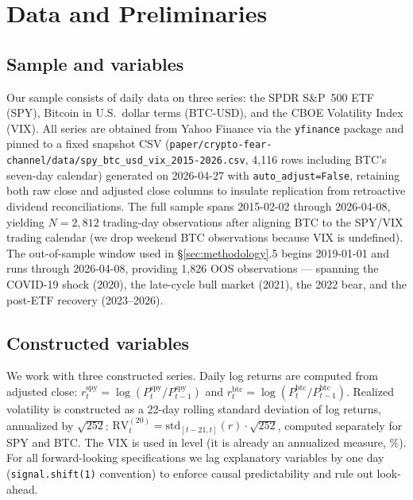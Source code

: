 \documentclass[11pt,a4paper]{article}
\begin{document}
\section{Data and Preliminaries}
\label{sec:data}

\subsection{Sample and variables}

Our sample consists of daily data on three series: the SPDR S\&P~500 ETF (SPY), Bitcoin in U.S.\ dollar terms (BTC-USD), and the CBOE Volatility Index (VIX). All series are obtained from Yahoo Finance via the \texttt{yfinance} package and pinned to a fixed snapshot CSV (\texttt{paper/crypto-fear-channel/data/spy\_btc\_usd\_vix\_2015-2026.csv}, 4{,}116 rows including BTC's seven-day calendar) generated on 2026-04-27 with \texttt{auto\_adjust=False}, retaining both raw close and adjusted close columns to insulate replication from retroactive dividend reconciliations. The full sample spans 2015-02-02 through 2026-04-08, yielding $N = 2{,}812$ trading-day observations after aligning BTC to the SPY/VIX trading calendar (we drop weekend BTC observations because VIX is undefined). The out-of-sample window used in \S\ref{sec:methodology}.5 begins 2019-01-01 and runs through 2026-04-08, providing 1{,}826 OOS observations --- spanning the COVID-19 shock (2020), the late-cycle bull market (2021), the 2022 bear, and the post-ETF recovery (2023--2026).%

\subsection{Constructed variables}

We work with three constructed series. Daily log returns are computed from adjusted close: $r^{\text{spy}}_t = \log(P^{\text{spy}}_t / P^{\text{spy}}_{t-1})$ and $r^{\text{btc}}_t = \log(P^{\text{btc}}_t / P^{\text{btc}}_{t-1})$. Realized volatility is constructed as a 22-day rolling standard deviation of log returns, annualized by $\sqrt{252}$: $\text{RV}^{(20)}_t = \text{std}_{[t-21,t]}(r) \cdot \sqrt{252}$, computed separately for SPY and BTC. The VIX is used in level (it is already an annualized measure, $\%$). For all forward-looking specifications we lag explanatory variables by one day (\texttt{signal.shift(1)} convention) to enforce causal predictability and rule out look-ahead.
\end{document}
